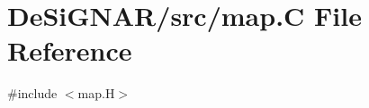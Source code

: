 \hypertarget{map_8_c}{}\section{De\+Si\+G\+N\+A\+R/src/map.C File Reference}
\label{map_8_c}
{\ttfamily \#include $<$map.\+H$>$}\newline
